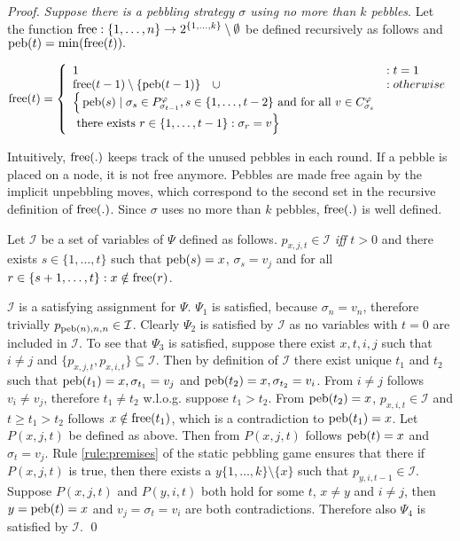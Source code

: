 \begin{proof}
\emph{Suppose there is a pebbling strategy $\sigma$ using no more than $k$ pebbles}. Let the function $\operatorname{free}: \{1,\ldots,n\} \rightarrow 2^{\{1,\ldots,k\}} \setminus \emptyset$ be defined recursively as follows and $\operatorname{peb}(t) = \min(\operatorname{free}(t)).$

$$
\operatorname{free}(t) = \left\{
  \begin{array}{ll}
    1 & : t = 1\\
    \operatorname{free}(t-1) \setminus \{\operatorname{peb}(t-1)\} \quad \cup & : otherwise\\
		\Big\{\operatorname{peb}(s) \mid \sigma_{s} \in P_{\sigma_{t-1}}^{\varphi}, s \in \{1,\ldots,t-2\} \text{ and for all } v \in C_{\sigma_{s}}^{\varphi}&\\
		\text{ there exists } r \in \{1,\ldots,t-1\}: \sigma_{r} = v \Big\}&
  \end{array}
\right.
$$

Intuitively, $\operatorname{free}(.)$ keeps track of the unused pebbles in each round.
If a pebble is placed on a node, it is not free anymore.
Pebbles are made free again by the implicit unpebbling moves, which correspond to the second set in the recursive definition of $\operatorname{free}(.)$.
Since $\sigma$ uses no more than $k$ pebbles, $\operatorname{free}(.)$ is well defined.

Let $\mathcal{I}$ be a set of variables of $\Psi$ defined as follows.
$p_{x,j,t} \in \mathcal{I}$ \emph{iff} $t > 0$ and there exists $s \in \{1,\ldots,t\}$ such that $\operatorname{peb}(s) = x$, $\sigma_s = v_j$ and for all $r \in \{s+1,\ldots,t\}: x \notin \operatorname{free}(r)$.

$\mathcal{I}$ is a satisfying assignment for $\Psi$.
$\Psi_1$ is satisfied, because $\sigma_n = v_n$, therefore trivially $p_{\operatorname{peb}(n),n,n} \in \mathcal{I}$.
Clearly $\Psi_2$ is satisfied by $\mathcal{I}$ as no variables with $t = 0$ are included in $\mathcal{I}$.
To see that $\Psi_3$ is satisfied, suppose there exist $x,t,i,j$ such that $i \neq j$ and $\{p_{x,j,t},p_{x,i,t}\} \subseteq \mathcal{I}$.
Then by definition of $\mathcal{I}$ there exist unique $t_1$ and $t_2$ such that $\operatorname{peb}(t_1) = x, \sigma_{t_1} = v_j$ and $\operatorname{peb}(t_2) = x, \sigma_{t_2} = v_i$.
From $i \neq j$ follows $v_i \neq v_j$, therefore $t_1 \neq t_2$ w.l.o.g. suppose $t_1 > t_2$.
From $\operatorname{peb}(t_2) = x$, $p_{x,i,t} \in \mathcal{I}$ and $t \geq t_1 > t_2$ follows $x \notin \operatorname{free}(t_1)$, which is a contradiction to $\operatorname{peb}(t_1) = x$.
Let $P(x,j,t)$ be defined as above. Then from $P(x,j,t)$ follows $\operatorname{peb}(t) = x$ and $\sigma_t = v_j$.
Rule \ref{rule:premises} of the static pebbling game ensures that there if $P(x,j,t)$ is true, then there exists a $y \{1,\ldots,k\} \setminus \{x\}$ such that $p_{y,i,t-1} \in \mathcal{I}$.
Suppose $P(x,j,t)$ and $P(y,i,t)$ both hold for some $t$, $x \neq y$ and $i \neq j$, then $y = \operatorname{peb}(t) = x$ and $v_j = \sigma_t = v_i$ are both contradictions. 
Therefore also $\Psi_4$ is satisfied by $\mathcal{I}$.
\qed
\end{proof}